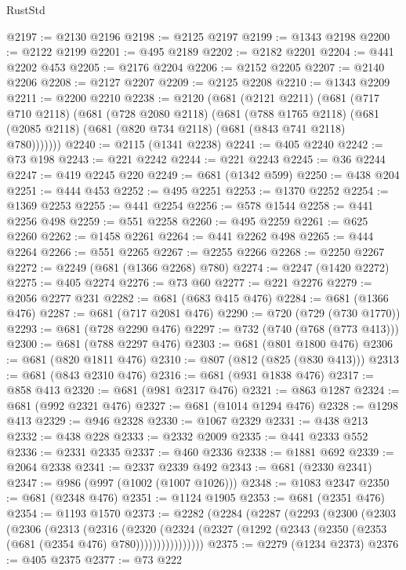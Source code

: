 \begin{lexlean}{RustStd}
\begin{coremodule}
@2197 := @2130 @2196
@2198 := @2125 @2197
@2199 := @1343 @2198
@2200 := @2122 @2199
@2201 := @495 @2189
@2202 := @2182 @2201
@2204 := @441 @2202 @453
@2205 := @2176 @2204
@2206 := @2152 @2205
@2207 := @2140 @2206
@2208 := @2127 @2207
@2209 := @2125 @2208
@2210 := @1343 @2209
@2211 := @2200 @2210
@2238 := @2120
    (@681
      (@2121 @2211)
      (@681
        (@717 @710 @2118)
        (@681
          (@728 @2080 @2118)
          (@681
            (@788 @1765 @2118)
            (@681 (@2085 @2118) (@681 (@820 @734 @2118) (@681 (@843 @741 @2118) @780)))))))
@2240 := @2115 (@1341 @2238)
@2241 := @405 @2240
@2242 := @73 @198
@2243 := @221 @2242
@2244 := @221 @2243
@2245 := @36 @2244
@2247 := @419 @2245 @220
@2249 := @681 (@1342 @599)
@2250 := @438 @204
@2251 := @444 @453
@2252 := @495 @2251
@2253 := @1370 @2252
@2254 := @1369 @2253
@2255 := @441 @2254
@2256 := @578 @1544
@2258 := @441 @2256 @498
@2259 := @551 @2258
@2260 := @495 @2259
@2261 := @625 @2260
@2262 := @1458 @2261
@2264 := @441 @2262 @498
@2265 := @444 @2264
@2266 := @551 @2265
@2267 := @2255 @2266
@2268 := @2250 @2267
@2272 := @2249 (@681 (@1366 @2268) @780)
@2274 := @2247 (@1420 @2272)
@2275 := @405 @2274
@2276 := @73 @60
@2277 := @221 @2276
@2279 := @2056 @2277 @231
@2282 := @681 (@683 @415 @476)
@2284 := @681 (@1366 @476)
@2287 := @681 (@717 @2081 @476)
@2290 := @720 (@729 (@730 @1770))
@2293 := @681 (@728 @2290 @476)
@2297 := @732 (@740 (@768 (@773 @413)))
@2300 := @681 (@788 @2297 @476)
@2303 := @681 (@801 @1800 @476)
@2306 := @681 (@820 @1811 @476)
@2310 := @807 (@812 (@825 (@830 @413)))
@2313 := @681 (@843 @2310 @476)
@2316 := @681 (@931 @1838 @476)
@2317 := @858 @413
@2320 := @681 (@981 @2317 @476)
@2321 := @863 @1287
@2324 := @681 (@992 @2321 @476)
@2327 := @681 (@1014 @1294 @476)
@2328 := @1298 @413
@2329 := @946 @2328
@2330 := @1067 @2329
@2331 := @438 @213
@2332 := @438 @228
@2333 := @2332 @2009
@2335 := @441 @2333 @552
@2336 := @2331 @2335
@2337 := @460 @2336
@2338 := @1881 @692
@2339 := @2064 @2338
@2341 := @2337 @2339 @492
@2343 := @681 (@2330 @2341)
@2347 := @986 (@997 (@1002 (@1007 @1026)))
@2348 := @1083 @2347
@2350 := @681 (@2348 @476)
@2351 := @1124 @1905
@2353 := @681 (@2351 @476)
@2354 := @1193 @1570
@2373 := @2282
    (@2284
      (@2287
        (@2293
          (@2300
            (@2303
              (@2306
                (@2313
                  (@2316
                    (@2320
                      (@2324
                        (@2327 (@1292 (@2343 (@2350 (@2353 (@681 (@2354 @476) @780))))))))))))))))
@2375 := @2279 (@1234 @2373)
@2376 := @405 @2375
@2377 := @73 @222

\end{coremodule}
\end{lexlean}
